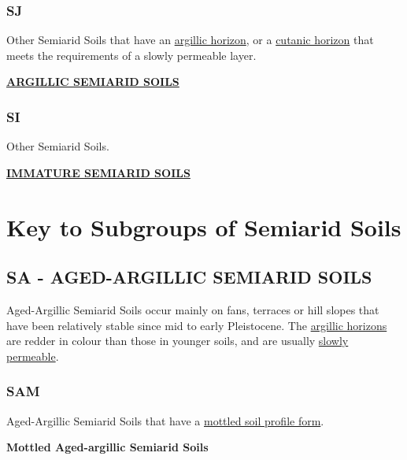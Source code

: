 \documentclass[
  letterpaper,
  DIV=11,
  numbers=noendperiod]{scrreprt}
\begin{document}
\hypertarget{sec-key-SJ}{%
\subsubsection{\texorpdfstring{\textbf{SJ}}{SJ}}\label{sec-key-SJ}}

Other Semiarid Soils that have an
\protect\hyperlink{sec-diag-argh}{argillic horizon}, or a
\protect\hyperlink{sec-diag-cuth}{cutanic horizon} that meets the
requirements of a slowly permeable layer.

\protect\hyperlink{sec-SJ}{\textbf{ARGILLIC SEMIARID SOILS}}

\hypertarget{sec-key-SI}{%
\subsubsection{\texorpdfstring{\textbf{SI}}{SI}}\label{sec-key-SI}}

Other Semiarid Soils.

\protect\hyperlink{sec-SI}{\textbf{IMMATURE SEMIARID SOILS}}

\hypertarget{sec-sub-S}{%
\section{Key to Subgroups of Semiarid Soils}\label{sec-sub-S}}

\hypertarget{sec-SA}{%
\subsection{\texorpdfstring{\textbf{SA} - AGED-ARGILLIC SEMIARID
SOILS}{SA - AGED-ARGILLIC SEMIARID SOILS}}\label{sec-SA}}

Aged-Argillic Semiarid Soils occur mainly on fans, terraces or hill
slopes that have been relatively stable since mid to early Pleistocene.
The \protect\hyperlink{sec-diag-argh}{argillic horizons} are redder in
colour than those in younger soils, and are usually
\protect\hyperlink{sec-diag-slowp}{slowly permeable}.

\hypertarget{sec-key-SAM}{%
\subsubsection{\texorpdfstring{\textbf{SAM}}{SAM}}\label{sec-key-SAM}}

Aged-Argillic Semiarid Soils that have a
\protect\hyperlink{sec-diag-mottpf}{mottled soil profile form}.

\textbf{Mottled Aged-argillic Semiarid Soils}
\end{document}
